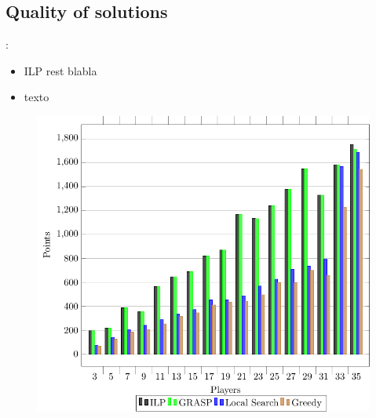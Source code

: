 \documentclass[9pt, aspectratio=169, xcolor=table]{beamer}
\begin{document}
\subsection{Quality of solutions}
\begin{frame}{\secname: \subsecname}
    \begin{minipage}{0.44\textwidth}
	\begin{itemize}
	    \item ILP rest blabla
	    \item texto
	\end{itemize}
    \end{minipage}
    \hfill
    \begin{minipage}{0.52\textwidth}
	\centering
	\begin{figure}[H]
	    \centering
	    \includegraphics[width=\linewidth]{../plots/solutions.pdf}
	\end{figure}
    \end{minipage}
\end{frame}
\end{document}
